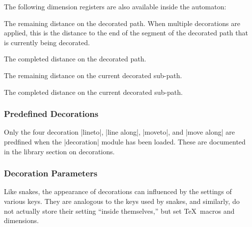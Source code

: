 \begin{command}{\pgfdeclaredecoration{}}
\begin{command}{\state{}}
		 The following dimension registers are also available inside the 
		 automaton:
		
		\begin{command}{\pgfdecoratedremainingdistance}
				The remaining distance on the decorated path. When multiple
				decorations are applied, this is the distance to the end
				of the segment of the decorated path that is currently being
				decorated.
		\end{command}
		
		\begin{command}{\pgfdecoratedcompleteddistance}
				The completed distance on the decorated path.
		\end{command}
		
		\begin{command}{\pgfdecoratedsubpathremainingdistance}
				The remaining distance on the current decorated sub-path.
		\end{command}
		
		\begin{command}{\pgfdecoratedsubpathcompleteddistance}
				The completed distance on the current decorated sub-path.
		\end{command}
	\end{command}
\end{command}


\subsubsection{Predefined Decorations}

Only the four decoration |lineto|, |line along|, |moveto|, and
|move along| are predfined when the |decoration| module has been
loaded. These are documented in the library section on decorations.


\subsubsection{Decoration Parameters}

Like snakes, the appearance of decorations can influenced by the 
settings of various keys. They are analogous to the keys used 
by snakes, and similarly, do not actually store their
setting ``inside themselves,'' but set \TeX\ macros and dimensions.

